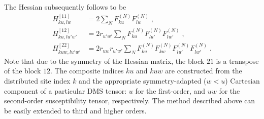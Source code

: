 \documentclass[aip,jcp,preprint,amsmath,amssymb,floatfix]{revtex4-1}
\begin{document}
The Hessian subsequently follows to be
%
\begin{subequations}
 \begin{align}
  H^{[11]}_{ku,lw} &= 2\sum_N F^{(N)}_{ku} F^{(N)}_{lw} \;,\\
  H^{[12]}_{ku,lu'w'} &= 2r_{u'w'} \sum_N F^{(N)}_{ku} F^{(N)}_{lu'} F^{(N)}_{lw'}  \;,\\
  H^{[22]}_{kuw,lu'w'} &= 2r_{uw} r_{u'w'} \sum_N F^{(N)}_{ku} F^{(N)}_{kw} F^{(N)}_{lu'} F^{(N)}_{lw'} \;.
 \end{align}
\end{subequations}
%
Note that due to the symmetry of the Hessian matrix, the block $21$
is a transpose of the block $12$. The composite indices $ku$ and $kuw$ 
are constructed from the distributed site index $k$ and the appropriate 
symmetry\hyp{}adapted ($w<u$) Cartesian component of a particular DMS tensor: 
$u$ for the first\hyp{}order, and $uw$ for the second\hyp{}order susceptibility 
tensor, respectively. The method described above can be easily extended 
to third and higher orders.

%

\end{document}
